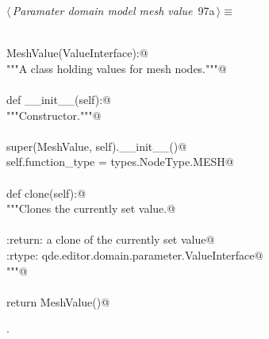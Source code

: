 \documentclass[
    a4paper,      %
    10pt,         %
    openright,    %
    notitlepage,  %
    parskip=half, %
]{scrreprt}       %
\theoremstyle{definition}                    %
\begin{document}
\begin{flushleft} \small
\begin{minipage}{\linewidth}\label{scrap155}\raggedright\small
{} $\langle\,${\itshape Paramater domain model mesh value}\nobreak\ {\footnotesize {97a}}$\,\rangle\equiv$
\vspace{-1exm}
\begin{list}{}{} \item
\mbox{}\lstinline@@\\
\mbox{}\lstinline@class MeshValue(ValueInterface):@\\
\mbox{}\lstinline@    """A class holding values for mesh nodes."""@\\
\mbox{}\lstinline@@\\
\mbox{}\lstinline@    def __init__(self):@\\
\mbox{}\lstinline@        """Constructor."""@\\
\mbox{}\lstinline@@\\
\mbox{}\lstinline@        super(MeshValue, self).__init__()@\\
\mbox{}\lstinline@        self.function_type = types.NodeType.MESH@\\
\mbox{}\lstinline@@\\
\mbox{}\lstinline@    def clone(self):@\\
\mbox{}\lstinline@        """Clones the currently set value.@\\
\mbox{}\lstinline@@\\
\mbox{}\lstinline@        :return: a clone of the currently set value@\\
\mbox{}\lstinline@        :rtype:  qde.editor.domain.parameter.ValueInterface@\\
\mbox{}\lstinline@        """@\\
\mbox{}\lstinline@@\\
\mbox{}\lstinline@        return MeshValue()@{\NWsep}
\end{list}
\vspace{-1.5ex}
\footnotesize
\begin{list}{}{\setlength{\itemsep}{-\parsep}\setlength{\itemindent}{-\leftmargin}}
\item {\NWtxtMacroNoRef}.

\item{}
\end{list}
\end{minipage}\vspace{4ex}
\end{flushleft}
\end{document}
